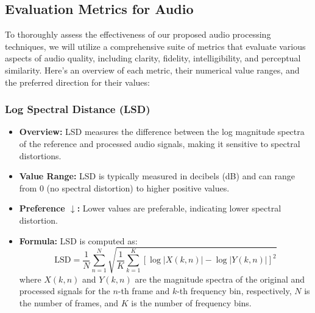 \documentclass{ioereport}
\begin{document}
\subsection{Evaluation Metrics for Audio}
To thoroughly assess the effectiveness of our proposed audio processing techniques, we will utilize a comprehensive suite of metrics that evaluate various aspects of audio quality, including clarity, fidelity, intelligibility, and perceptual similarity. Here's an overview of each metric, their numerical value ranges, and the preferred direction for their values:

\subsubsection{Log Spectral Distance (LSD)}
\begin{itemize}
    \item \textbf{Overview:} LSD measures the difference between the log magnitude spectra of the reference and processed audio signals, making it sensitive to spectral distortions.
    
    \item \textbf{Value Range:} LSD is typically measured in decibels (dB) and can range from 0 (no spectral distortion) to higher positive values.
    
    \item \textbf{Preference $\downarrow$:} Lower values are preferable, indicating lower spectral distortion.
    
    \item \textbf{Formula:} LSD is computed as:
    \begin{equation}
        \text{LSD} = \frac{1}{N} \sum_{n=1}^{N} \sqrt{\frac{1}{K} \sum_{k=1}^{K} \left[ \log |X(k,n)| - \log |Y(k,n)| \right]^2}
    \end{equation}
    where \( X(k,n) \) and \( Y(k,n) \) are the magnitude spectra of the original and processed signals for the \( n \)-th frame and \( k \)-th frequency bin, respectively, \( N \) is the number of frames, and \( K \) is the number of frequency bins.
\end{itemize}
\end{document}
